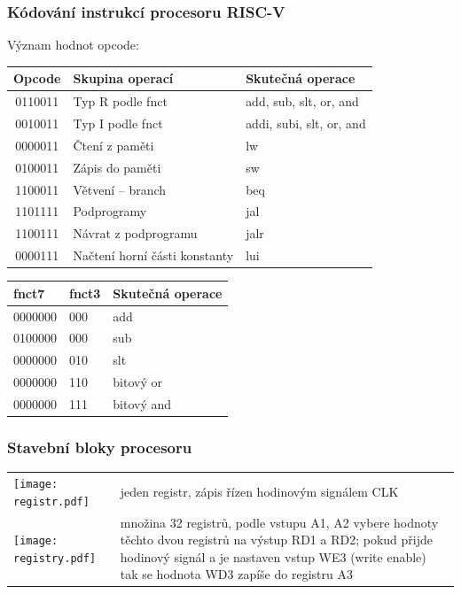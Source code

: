 \documentclass{beamer}
\begin{document}
\begin{frame}
\frametitle{Kódování instrukcí procesoru RISC-V}

Význam hodnot opcode:
\begin{table}
\footnotesize
\begin{tabular}{|c|l|l|}\hline
Opcode & Skupina operací & Skutečná operace \\ \hline
0110011 & Typ R podle fnct & add, sub, slt, or, and \\ \hline
0010011 & Typ I podle fnct & addi, subi, slt, or, and \\ \hline
0000011 & Čtení z paměti & lw \\ \hline
0100011 & Zápis do paměti & sw \\ \hline
1100011 & Větvení -- branch & beq \\ \hline
1101111 & Podprogramy & jal \\ \hline
1100111 & Návrat z podprogramu & jalr \\ \hline
0000111 & Načtení horní části konstanty & lui \\ \hline
\end{tabular}
\end{table}

\begin{table}
\footnotesize
\begin{tabular}{|l|l|l|}\hline
fnct7 & fnct3 & Skutečná operace \\ \hline
0000000 & 000  & add \\ \hline
0100000 & 000  & sub \\ \hline
0000000 & 010  & slt \\ \hline
0000000 & 110  & bitový or \\ \hline
0000000 & 111  & bitový and \\ \hline
\end{tabular}
\end{table}

\end{frame}


\begin{frame}
\frametitle{Stavební bloky procesoru}

\begin{table}
\footnotesize
\begin{tabular}{m{1.6cm} m{10cm}}
\hfill \texttt{[image: registr.pdf]} & jeden registr, zápis řízen hodinovým signálem CLK \\ 
\hfill \texttt{[image: registry.pdf]} & množina 32 registrů, podle vstupu A1, A2 vybere hodnoty těchto dvou registrů na výstup RD1 a RD2; pokud přijde hodinový signál a je nastaven vstup WE3 (write enable) tak se hodnota WD3 zapíše do registru A3 \\
\end{tabular}
\end{table}

\end{frame}
\end{document}
